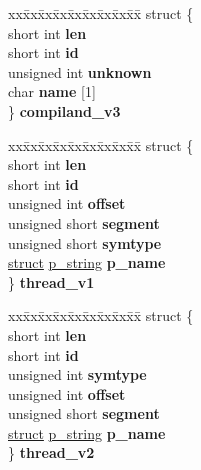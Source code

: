 \begin{DoxyCompactItemize}
\begin{tabbing}
\end{tabbing}\item 
\mbox{\label{unioncodeview__symbol_a9a83e897a295176e07a8cf1b62b87a5c}} 
\begin{tabbing}
xx\=xx\=xx\=xx\=xx\=xx\=xx\=xx\=xx\=\kill
struct \{\\
\>short int {\bfseries len}\\
\>short int {\bfseries id}\\
\>unsigned int {\bfseries unknown}\\
\>char {\bfseries name} \mbox{[}1\mbox{]}\\
\} {\bfseries compiland\_v3}\\

\end{tabbing}\item 
\mbox{\label{unioncodeview__symbol_a2aa46458f0ac54a3c2a11d27a7e072b3}} 
\begin{tabbing}
xx\=xx\=xx\=xx\=xx\=xx\=xx\=xx\=xx\=\kill
struct \{\\
\>short int {\bfseries len}\\
\>short int {\bfseries id}\\
\>unsigned int {\bfseries offset}\\
\>unsigned short {\bfseries segment}\\
\>unsigned short {\bfseries symtype}\\
\>\hyperlink{interfacestruct}{struct} \hyperlink{structp__string}{p\_string} {\bfseries p\_name}\\
\} {\bfseries thread\_v1}\\

\end{tabbing}\item 
\mbox{\label{unioncodeview__symbol_a79a8706ade96907b5b4b92303d450785}} 
\begin{tabbing}
xx\=xx\=xx\=xx\=xx\=xx\=xx\=xx\=xx\=\kill
struct \{\\
\>short int {\bfseries len}\\
\>short int {\bfseries id}\\
\>unsigned int {\bfseries symtype}\\
\>unsigned int {\bfseries offset}\\
\>unsigned short {\bfseries segment}\\
\>\hyperlink{interfacestruct}{struct} \hyperlink{structp__string}{p\_string} {\bfseries p\_name}\\
\} {\bfseries thread\_v2}\\


\end{tabbing}
\end{DoxyCompactItemize}
